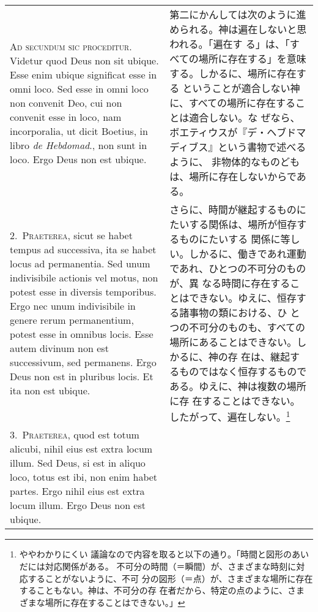 \documentclass[10pt]{jsarticle} %
\begin{document}
\begin{longtable}{p{21em}p{21em}}
{\huge A}{\scshape d secundum sic proceditur}. Videtur quod Deus non sit
 ubique. Esse enim ubique significat esse in omni loco. Sed esse in omni
 loco non convenit Deo, cui non convenit esse in loco, nam incorporalia,
 ut dicit Boetius, in libro {\itshape de Hebdomad}., non sunt in loco. Ergo Deus
 non est ubique.

&

第二にかんしては次のように進められる。神は遍在しないと思われる。「遍在す
 る」は、「すべての場所に存在する」を意味する。しかるに、場所に存在する
 ということが適合しない神に、すべての場所に存在することは適合しない。な
 ぜなら、ボエティウスが『デ・ヘブドマディブス』という書物で述べるように、
 非物体的なものどもは、場所に存在しないからである。

\\

2.~{\scshape Praeterea}, sicut se habet tempus ad successiva, ita se habet
 locus ad permanentia. Sed unum indivisibile actionis vel motus, non
 potest esse in diversis temporibus. Ergo nec unum indivisibile in
 genere rerum permanentium, potest esse in omnibus locis. Esse autem
 divinum non est successivum, sed permanens. Ergo Deus non est in
 pluribus locis. Et ita non est ubique.

&

さらに、時間が継起するものにたいする関係は、場所が恒存するものにたいする
 関係に等しい。しかるに、働きであれ運動であれ、ひとつの不可分のものが、異
 なる時間に存在することはできない。ゆえに、恒存する諸事物の類における、ひ
 とつの不可分のものも、すべての場所にあることはできない。しかるに、神の存
 在は、継起するものではなく恒存するものである。ゆえに、神は複数の場所に存
 在することはできない。したがって、遍在しない。\footnote{ややわかりにくい
 議論なので内容を取ると以下の通り。「時間と図形のあいだには対応関係がある。
 不可分の時間（＝瞬間）が、さまざまな時刻に対応することがないように、不可
 分の図形（＝点）が、さまざまな場所に存在することもない。神は、不可分の存
 在者だから、特定の点のように、さまざまな場所に存在することはできない。」}


\\



3.~{\scshape Praeterea}, quod est totum alicubi, nihil eius est extra locum
 illum. Sed Deus, si est in aliquo loco, totus est ibi, non enim habet
 partes. Ergo nihil eius est extra locum illum. Ergo Deus non est
 ubique.

&


\end{longtable}
\end{document}
